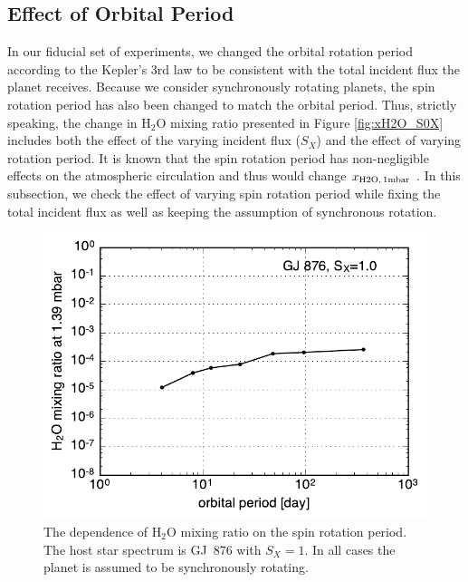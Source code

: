 \documentclass[11pt,numberedappendix,twocolappendix,]{emulateapj}
\def\water{H$_2$O }
\def\xwater{$x_{\rm H2O,\,1mbar}$ }
\begin{document}
\subsection{Effect of Orbital Period}
\label{ss:sensitivity_Porbit}

In our fiducial set of experiments, we changed the orbital rotation period according to the Kepler's 3rd law to be consistent with the total incident flux the planet receives. 
Because we consider synchronously rotating planets, the spin rotation period has also been changed to match the orbital period. 
Thus, strictly speaking, the change in \water mixing ratio presented in Figure \ref{fig:xH2O_S0X} includes both the effect of the varying incident flux ($S_X$) and the effect of varying rotation period. 
It is known that the spin rotation period has non-negligible effects on the atmospheric circulation \citep{Yang2013, Kopparapu2016, Way2016} and thus would change \xwater. 
In this subsection, we check the effect of varying spin rotation period while fixing the total incident flux as well as keeping the assumption of synchronous rotation. 


\begin{figure}[!h]
    \begin{center}
    \includegraphics[width=\hsize]{fig/xH2O_Prot.pdf}
    \end{center}
\caption{The dependence of \water mixing ratio on the spin rotation period. The host star spectrum is GJ~876 with $S_X=1$. In all cases the planet is assumed to be synchronously rotating. }
\label{fig:changeP}
\end{figure}
\end{document}
